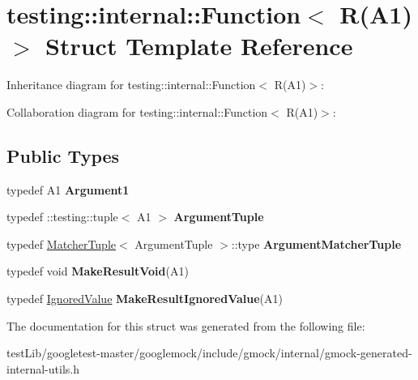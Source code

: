 \hypertarget{structtesting_1_1internal_1_1Function_3_01R_07A1_08_4}{}\section{testing\+:\+:internal\+:\+:Function$<$ R(A1)$>$ Struct Template Reference}
\label{structtesting_1_1internal_1_1Function_3_01R_07A1_08_4}


Inheritance diagram for testing\+:\+:internal\+:\+:Function$<$ R(A1)$>$\+:


Collaboration diagram for testing\+:\+:internal\+:\+:Function$<$ R(A1)$>$\+:
\subsection*{Public Types}
\begin{DoxyCompactItemize}
\item 
\mbox{\label{structtesting_1_1internal_1_1Function_3_01R_07A1_08_4_aca36c8586218fd015cc4736dc8d4c14f}} 
typedef A1 {\bfseries Argument1}
\item 
\mbox{\label{structtesting_1_1internal_1_1Function_3_01R_07A1_08_4_afd48881a58d72658e547a170fb0f2087}} 
typedef \+::testing\+::tuple$<$ A1 $>$ {\bfseries Argument\+Tuple}
\item 
\mbox{\label{structtesting_1_1internal_1_1Function_3_01R_07A1_08_4_a0e35671ae43c3d3310893e1d6d895d06}} 
typedef \hyperlink{structtesting_1_1internal_1_1MatcherTuple}{Matcher\+Tuple}$<$ Argument\+Tuple $>$\+::type {\bfseries Argument\+Matcher\+Tuple}
\item 
\mbox{\label{structtesting_1_1internal_1_1Function_3_01R_07A1_08_4_aab10495172953eb51fc3940c4c1e890a}} 
typedef void {\bfseries Make\+Result\+Void}(A1)
\item 
\mbox{\label{structtesting_1_1internal_1_1Function_3_01R_07A1_08_4_a8fa56b9e05cb029ec7c8415ee352f865}} 
typedef \hyperlink{classtesting_1_1internal_1_1IgnoredValue}{Ignored\+Value} {\bfseries Make\+Result\+Ignored\+Value}(A1)
\end{DoxyCompactItemize}


The documentation for this struct was generated from the following file\+:\begin{DoxyCompactItemize}
\item 
test\+Lib/googletest-\/master/googlemock/include/gmock/internal/gmock-\/generated-\/internal-\/utils.\+h\end{DoxyCompactItemize}
